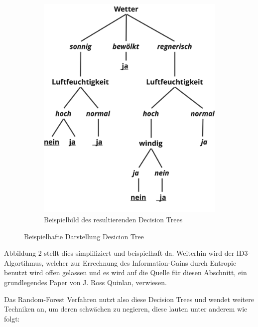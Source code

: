 \begin{figure}[h!]
\begin{subfigure}[b]{0.45\textwidth}
        \includegraphics[width=\textwidth]{../Bilder/DT_ex.png}
        \caption{Beispielbild des resultierenden Decision Trees}
        \label{fig:example}
    \end{subfigure}
    \caption{Beispielhafte Darstellung Desicion Tree}
\end{figure}

Abbildung 2 stellt dies simplifiziert und beispielhaft da. Weiterhin wird der ID3-Algortihmus, welcher zur Errechnung des Information-Gains durch Entropie
benutzt wird offen gelassen und es wird auf die Quelle für diesen Abschnitt, ein grundlegendes Paper von J. Ross Quinlan, verwiesen. \cite{Quinlan1986}

Das Random-Forest Verfahren nutzt also diese Decision Trees und wendet weitere Techniken an, um deren schwächen zu negieren, diese lauten unter anderem wie folgt:

